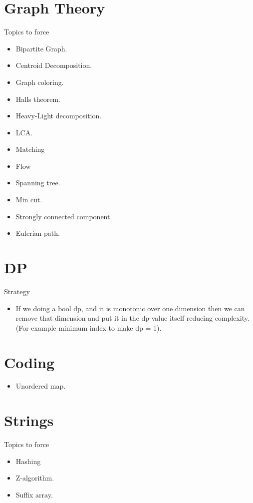 \documentclass[../Notes.tex]{subfiles}
\begin{document}
\section{Graph Theory}
Topics to force
\begin{itemize}
	\item Bipartite Graph.
	\item Centroid Decomposition.
	\item Graph coloring.
	\item Halls theorem.
	\item Heavy-Light decomposition.
	\item LCA.
	\item Matching
	\item Flow
	\item Spanning tree.
	\item Min cut.
	\item Strongly connected component.
	\item Eulerian path.
\end{itemize}

\section{DP}
Strategy
\begin{itemize}
	\item If we doing a bool dp, and it is monotonic over one dimension then we can remove that dimension and put it in the dp-value itself reducing complexity.(For example minimum index to make dp = 1).
\end{itemize}

\section{Coding}
\begin{itemize}
	\item Unordered map.
\end{itemize}

\section{Strings}
Topics to force
\begin{itemize}
	\item Hashing
	\item Z-algorithm.
	\item Suffix array.
\end{itemize}
\end{document}
